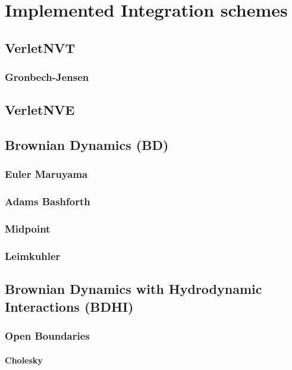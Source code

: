 \documentclass[ twoside,openright,titlepage,numbers=noenddot,%
headinclude,footinclude,cleardoublepage=empty,abstract=on,
BCOR=5mm,paper=a4,fontsize=11pt
]{scrreprt}
\begin{document}
\part{Implemented Integration schemes}\label{pt:integrators}

\chapter{VerletNVT}
\section{Gronbech-Jensen}
\chapter{VerletNVE}

\chapter{Brownian Dynamics (BD)}

\section{Euler Maruyama}

\section{Adams Bashforth}

\section{Midpoint}

\section{Leimkuhler}

\chapter{Brownian Dynamics with Hydrodynamic Interactions (BDHI)}

\section{Open Boundaries}

\subsection{Cholesky}
\end{document}

